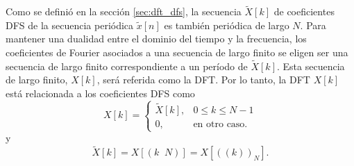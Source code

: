 \documentclass[a4paper]{report}
\DeclareMathOperator{\modulo}{m\acute odulo}
\begin{document}
Como se definió en la sección \ref{sec:dft_dfs}, la secuencia \(\tilde{X}[k]\) de coeficientes DFS de la secuencia periódica \(\tilde{x}[n]\) es también periódica de largo \(N\). Para mantener una dualidad entre el dominio del tiempo y la frecuencia, los coeficientes de Fourier asociados a una secuencia de largo finito se eligen ser una secuencia de largo finito correspondiente a un período de \(\tilde{X}[k]\). Esta secuencia de largo finito, \(X[k]\), será referida como la DFT. Por lo tanto, la DFT \(X[k]\) está relacionada a los coeficientes DFS como
\begin{equation}\label{eq:dft_representation_X_from_tildeX}
 X[k]=
 \left\{
 \begin{array}{ll}
  \tilde{X}[k], & 0\leq k\leq N-1\\
  0, & \textrm{en otro caso.}
 \end{array}
 \right.   
\end{equation}
y
\begin{equation}\label{eq:dft_representation_tildeX_from_X}
 \tilde{X}[k]=X[(k\modulo N)]=X[((k))_N]. 
\end{equation}
\end{document}
